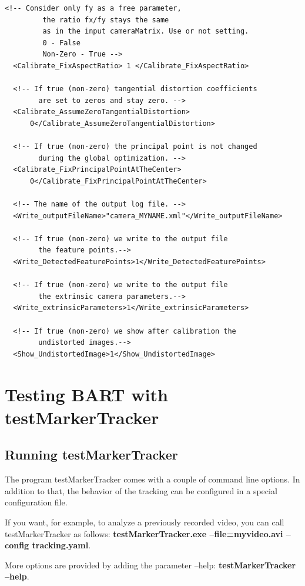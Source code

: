 \begin{lstlisting}[float,caption={Configuration file example for camera calibration - Expert settings},label=cameracalibrationconfigexampleexpertsettings]
  <!-- Consider only fy as a free parameter, 
         the ratio fx/fy stays the same 
         as in the input cameraMatrix. Use or not setting. 
         0 - False 
         Non-Zero - True -->
  <Calibrate_FixAspectRatio> 1 </Calibrate_FixAspectRatio>
  
  <!-- If true (non-zero) tangential distortion coefficients 
        are set to zeros and stay zero. -->
  <Calibrate_AssumeZeroTangentialDistortion>
      0</Calibrate_AssumeZeroTangentialDistortion>
  
  <!-- If true (non-zero) the principal point is not changed 
        during the global optimization. -->
  <Calibrate_FixPrincipalPointAtTheCenter>
      0</Calibrate_FixPrincipalPointAtTheCenter>
  
  <!-- The name of the output log file. -->
  <Write_outputFileName>"camera_MYNAME.xml"</Write_outputFileName>
  
  <!-- If true (non-zero) we write to the output file 
        the feature points.-->
  <Write_DetectedFeaturePoints>1</Write_DetectedFeaturePoints>
  
  <!-- If true (non-zero) we write to the output file 
        the extrinsic camera parameters.-->
  <Write_extrinsicParameters>1</Write_extrinsicParameters>
  
  <!-- If true (non-zero) we show after calibration the 
        undistorted images.-->
  <Show_UndistortedImage>1</Show_UndistortedImage>
\end{lstlisting}

\section{Testing BART with testMarkerTracker}

\subsection{Running testMarkerTracker}

The program testMarkerTracker comes with a couple of command line options. In addition to that, the behavior of the tracking can be configured in a special configuration file.

If you want, for example, to analyze a previously recorded video, you can call testMarkerTracker as follows:
{\bf testMarkerTracker.exe --file=myvideo.avi --config tracking.yaml}.

More options are provided by adding the parameter --help: {\bf testMarkerTracker --help}.



